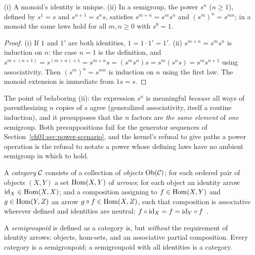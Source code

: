 \begin{proposition}\label{ch02:prop:monoid-basics}
(i) A monoid's identity is unique. (ii) In a semigroup, the power $s^n$
($n \geq 1$), defined by $s^1 = s$ and $s^{n+1} = s^n s$, satisfies
$s^{m+n} = s^m s^n$ and $(s^m)^n = s^{mn}$; in a monoid the same laws hold
for all $m, n \geq 0$ with $s^0 = 1$.
\end{proposition}

\begin{proof}
(i) If $1$ and $1'$ are both identities, $1 = 1 \cdot 1' = 1'$. (ii)
$s^{m+n} = s^m s^n$ is induction on $n$: the case $n = 1$ is the
definition, and $s^{m + (n+1)} = s^{(m+n)+1} = s^{m+n} s =
(s^m s^n) s = s^m (s^n s) = s^m s^{n+1}$ using associativity. Then
$(s^m)^n = s^{mn}$ is induction on $n$ using the first law. The monoid
extension is immediate from $1 s = s$.
\end{proof}

The point of belaboring (ii): the expression $s^n$ is meaningful
\emph{because} all ways of parenthesizing $n$ copies of $s$ agree
(generalized associativity, itself a routine induction), and it presupposes
that the $n$ factors are \emph{the same element} of \emph{one} semigroup.
Both presuppositions fail for the generator sequences of
Section~\ref{ch01:sec:power-scenario}, and the kernel's refusal to give
paths a power operation is the refusal to notate a power whose defining
laws have no ambient semigroup in which to hold.

\begin{definition}[Category]\label{ch02:def:category}
A \emph{category} $\mathcal{C}$ consists of a collection of \emph{objects}
$\mathrm{Ob}(\mathcal{C})$; for each ordered pair of objects $(X, Y)$ a set
$\mathrm{Hom}(X, Y)$ of \emph{arrows}; for each object an identity arrow
$\mathrm{id}_X \in \mathrm{Hom}(X, X)$; and a composition assigning to
$f \in \mathrm{Hom}(X, Y)$ and $g \in \mathrm{Hom}(Y, Z)$ an arrow
$g \circ f \in \mathrm{Hom}(X, Z)$, such that composition is associative wherever
defined and identities are neutral: $f \circ \mathrm{id}_X = f = \mathrm{id}_Y \circ f$
\cite{maclanecwm}.
\end{definition}

\begin{definition}[Semigroupoid]\label{ch02:def:semigroupoid}
A \emph{semigroupoid} is defined as a category is, but \emph{without} the
requirement of identity arrows: objects, hom-sets, and an associative
partial composition. Every category is a semigroupoid; a semigroupoid with
all identities is a category.
\end{definition}

